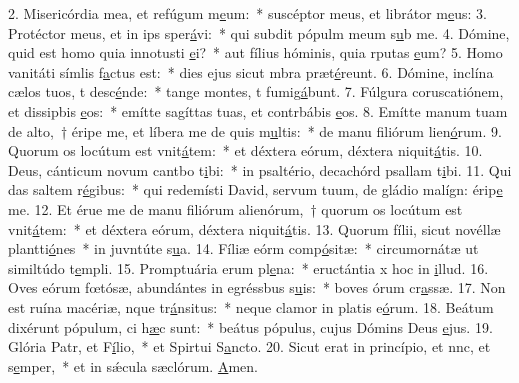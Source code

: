 2. Misericórdia mea, et refúgum m\uline{e}um:~* suscéptor meus, et librátor m\uline{e}us:
3. Protéctor meus, et in ips sper\uline{á}vi:~* qui subdit pópulm meum s\uline{u}b me.
4. Dómine, quid est homo quia innotusti \uline{e}i?~* aut fílius hóminis, quia rputas \uline{e}um?
5. Homo vanitáti símlis f\uline{a}ctus est:~* dies ejus sicut mbra præt\uline{é}reunt.
6. Dómine, inclína cælos tuos, t desc\uline{é}nde:~* tange montes, t fumig\uline{á}bunt.
7. Fúlgura coruscatiónem, et dissipbis \uline{e}os:~* emítte sagíttas tuas, et contrbábis \uline{e}os.
8. Emítte manum tuam de alto,~† éripe me, et líbera me de quis m\uline{u}ltis:~* de manu filiórum lien\uline{ó}rum.
9. Quorum os locútum est vnit\uline{á}tem:~* et déxtera eórum, déxtera niquit\uline{á}tis.
10. Deus, cánticum novum cantbo t\uline{i}bi:~* in psaltério, decachórd psallam t\uline{i}bi.
11. Qui das saltem r\uline{é}gibus:~* qui redemísti David, servum tuum, de gládio malígn: érip\uline{e} me.
12. Et érue me de manu filiórum alienórum,~† quorum os locútum est vnit\uline{á}tem:~* et déxtera eórum, déxtera niquit\uline{á}tis.
13. Quorum fílii, sicut novéllæ plantti\uline{ó}nes~* in juvntúte s\uline{u}a.
14. Fíliæ eórm comp\uline{ó}sitæ:~* circumornátæ ut similtúdo t\uline{e}mpli.
15. Promptuária erum pl\uline{e}na:~* eructántia x hoc in \uline{i}llud.
16. Oves eórum fœtósæ, abundántes in egréssbus s\uline{u}is:~* boves órum cr\uline{a}ssæ.
17. Non est ruína macériæ, nque tr\uline{á}nsitus:~* neque clamor in platis e\uline{ó}rum.
18. Beátum dixérunt pópulum, ci h\uline{æ}c sunt:~* beátus pópulus, cujus Dómins Deus \uline{e}jus.
19. Glória Patr, et F\uline{í}lio,~* et Spirtui S\uline{a}ncto.
20. Sicut erat in princípio, et nnc, et s\uline{e}mper,~* et in sǽcula sæclórum. \uline{A}men.
